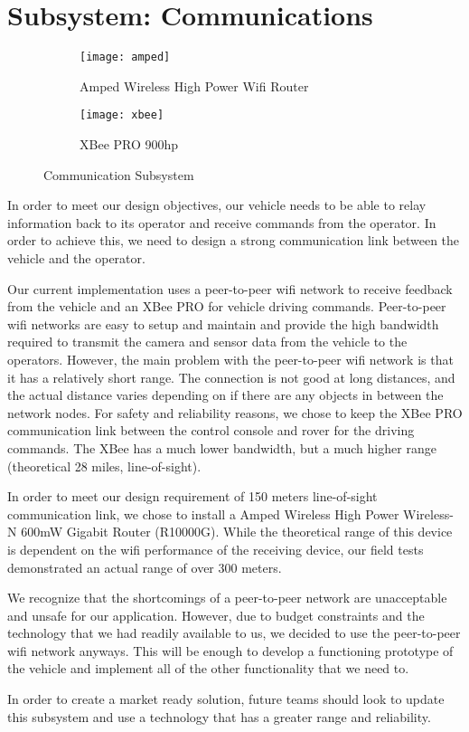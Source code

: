 \chapter{Subsystem: Communications} \label{chap:communications}

\begin{figure}[H]
	\centering
	\begin{subfigure}{.5\textwidth}
		\centering
		\texttt{[image: amped]}
		\caption{Amped Wireless High Power Wifi Router}
		\label{fig:sub1}
	\end{subfigure}%
	\begin{subfigure}{.5\textwidth}
		\centering
		\texttt{[image: xbee]}
		\caption{XBee PRO 900hp}
		\label{fig:sub2}
	\end{subfigure}
	\caption{Communication Subsystem}
	\label{fig:test}
\end{figure}

In order to meet our design objectives, our vehicle needs to be able to relay information back to its operator and receive commands from the operator.  In order to achieve this, we need to design a strong communication link between the vehicle and the operator.

Our current implementation uses a peer-to-peer wifi network to receive feedback from the vehicle and an XBee PRO for vehicle driving commands.  Peer-to-peer wifi networks are easy to setup and maintain and provide the high bandwidth required to transmit the camera and sensor data from the vehicle to the operators. However, the main problem with the peer-to-peer wifi network is that it has a relatively short range. The connection is not good at long distances, and the actual distance varies depending on if there are any objects in between the network nodes. For safety and reliability reasons, we chose to keep the XBee PRO communication link between the control console and rover for the driving commands. The XBee has a much lower bandwidth, but a much higher range (theoretical 28 miles, line-of-sight).

In order to meet our design requirement of 150 meters line-of-sight communication link, we chose to install a  Amped Wireless High Power Wireless-N 600mW Gigabit Router (R10000G). While the theoretical range of this device is dependent on the wifi performance of the receiving device, our field tests demonstrated an actual range of over 300 meters.

We recognize that the shortcomings of a peer-to-peer network are unacceptable and unsafe for our application. However, due to budget constraints and the technology that we had readily available to us, we decided to use the peer-to-peer wifi network anyways. This will be enough to develop a functioning prototype of the vehicle and implement all of the other functionality that we need to.

In order to create a market ready solution, future teams should look to update this subsystem and use a technology that has a greater range and reliability.